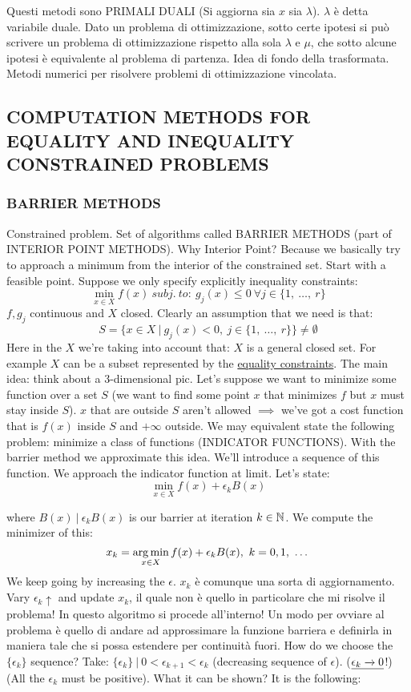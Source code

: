 Questi metodi sono PRIMALI DUALI (Si aggiorna sia $x$ sia $\lambda$). $\lambda$ è detta variabile duale. Dato un problema di ottimizzazione, sotto certe ipotesi si può scrivere un problema di ottimizzazione rispetto alla sola $\lambda$ e $\mu$, che sotto alcune ipotesi è equivalente al problema di partenza. Idea di fondo della trasformata. Metodi numerici per risolvere problemi di ottimizzazione vincolata.

\subsection{COMPUTATION METHODS FOR EQUALITY AND INEQUALITY CONSTRAINED PROBLEMS}

\subsubsection{BARRIER METHODS}

Constrained problem. Set of algorithms called BARRIER METHODS (part of INTERIOR POINT METHODS). Why Interior Point? Because we basically try to approach a minimum from the interior of the constrained set. Start with a feasible point. Suppose we only specify explicitly inequality constraints:
\[
	\min_{x\in X}{f(x)}\ subj.\ to:\ g_j(x)\leq 0\ \forall j\in\{1,\ \dots,\ r\}
\]
$f,g_j$ continuous and $X$ closed. Clearly an assumption that we need is that:
\[
	S = \{x\in X\ |\ g_j(x) < 0,\ j\in\{1,\ \dots,\ r\}\} \neq \emptyset
\]
Here in the $X$ we're taking into account that: $X$ is a general closed set. For example $X$ can be a subset represented by the \underline{equality constraints}. The main idea: think about a 3-dimensional pic. Let's suppose we want to minimize some function over a set $S$ (we want to find some point $x$ that minimizes $f$ but $x$ must stay inside $S$).
$x$ that are outside $S$ aren't allowed $\implies$ we've got a cost function that is $f(x)$ inside $S$ and $+\infty$ outside. We may equivalent state the following problem: minimize a class of functions (INDICATOR FUNCTIONS). With the barrier method we approximate this idea. We'll introduce a sequence of this function. We approach the indicator function at limit. Let's state:
\[
	\min_{x\in X}{f(x)+ \epsilon_kB(x)}
\]

where $B(x)\ |\ \epsilon_kB(x)$ is our barrier at iteration $k\in\mathbb{N}$. We compute the minimizer of this:
\[	
	x_k = \operatorname*{arg\,min}_{x\in X}{f(x) + \epsilon_kB(x)},\ k=0,1,\ \dots
\]
We keep going by increasing the $\epsilon$. $x_k$ è comunque una sorta di aggiornamento. Vary $\epsilon_k \uparrow$ and update $x_k$, il quale non è quello in particolare che mi risolve il problema! In questo algoritmo si procede all'interno! Un modo per ovviare al problema è quello di andare ad approssimare la funzione barriera e definirla in maniera tale che si possa estendere per continuità fuori. How do we choose the $\{\epsilon_k\}$ sequence?
Take: $\{\epsilon_k\}\ |\ 0<\epsilon_{k+1}<\epsilon_k$ (decreasing sequence of $\epsilon$). ($\underline{\epsilon_k \tendsto{} 0}$!) (All the $\epsilon_k$ must be positive). What it can be shown? It is the following:


